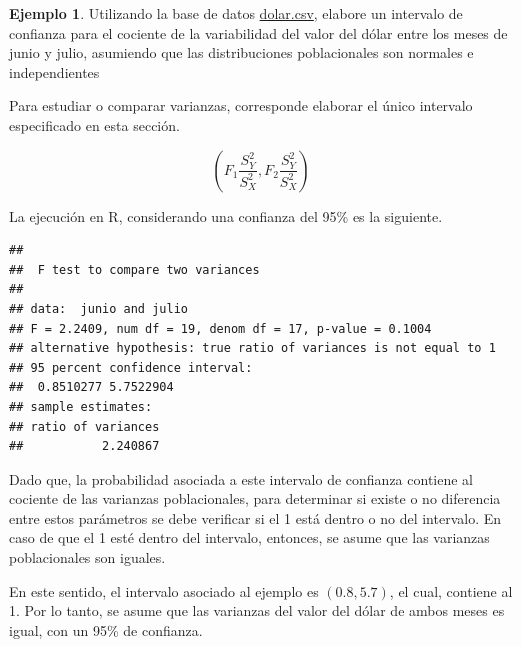 \documentclass[
  11pt,
]{book}
\newenvironment{Shaded}{\begin{snugshade}}{\end{snugshade}}
\newcommand{\AttributeTok}[1]{\textcolor[rgb]{0.13,0.29,0.53}{#1}}
\newcommand{\FloatTok}[1]{\textcolor[rgb]{0.00,0.00,0.81}{#1}}
\newcommand{\FunctionTok}[1]{\textcolor[rgb]{0.13,0.29,0.53}{\textbf{#1}}}
\newcommand{\NormalTok}[1]{#1}
\newcommand{\OtherTok}[1]{\textcolor[rgb]{0.56,0.35,0.01}{#1}}
\newcommand{\SpecialCharTok}[1]{\textcolor[rgb]{0.81,0.36,0.00}{\textbf{#1}}}
\newcommand{\StringTok}[1]{\textcolor[rgb]{0.31,0.60,0.02}{#1}}
\theoremstyle{definition}
\theoremstyle{definition}
\newtheorem{example}{Ejemplo}[chapter]
\theoremstyle{definition}
\theoremstyle{definition}
\theoremstyle{remark}
\begin{document}
\begin{example}
Utilizando la base de datos \href{https://raw.githubusercontent.com/Dfranzani/Bases-de-datos-para-cursos/main/2022-2/Estad\%C3\%ADstica\%201/dolar.csv}{dolar.csv}, elabore un intervalo de confianza para el cociente de la variabilidad del valor del dólar entre los meses de junio y julio, asumiendo que las distribuciones poblacionales son normales e independientes

Para estudiar o comparar varianzas, corresponde elaborar el único intervalo especificado en esta sección.

\[\left( F_1\frac{S_Y^2}{S_X^2},F_2\frac{S_Y^2}{S_X^2} \right)\]

La ejecución en R, considerando una confianza del 95\% es la siguiente.

\begin{Shaded}
\end{Shaded}

\begin{verbatim}
## 
##  F test to compare two variances
## 
## data:  junio and julio
## F = 2.2409, num df = 19, denom df = 17, p-value = 0.1004
## alternative hypothesis: true ratio of variances is not equal to 1
## 95 percent confidence interval:
##  0.8510277 5.7522904
## sample estimates:
## ratio of variances 
##           2.240867
\end{verbatim}

Dado que, la probabilidad asociada a este intervalo de confianza contiene al cociente de las varianzas poblacionales, para determinar si existe o no diferencia entre estos parámetros se debe verificar si el 1 está dentro o no del intervalo. En caso de que el 1 esté dentro del intervalo, entonces, se asume que las varianzas poblacionales son iguales.

En este sentido, el intervalo asociado al ejemplo es \((0.8, 5.7)\), el cual, contiene al 1. Por lo tanto, se asume que las varianzas del valor del dólar de ambos meses es igual, con un 95\% de confianza.
\end{example}
\end{document}
